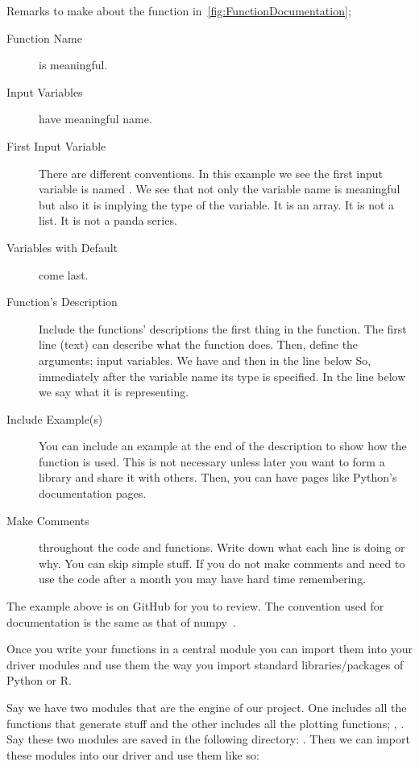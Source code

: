 \noindent Remarks to make about the function in~\cref{fig:FunctionDocumentation};
\begin{description}
\item [Function Name] is meaningful.
\item [Input Variables] have meaningful name. 
\item [First Input Variable] There are different conventions. In this
example we see the first input variable is named .
We see that not only the variable name is meaningful but also
it is implying the type of the variable. It is an array. It is not a list.
It is not a panda series. 
\item [Variables with Default] come last.

\item [Function's Description] Include the functions' descriptions
the first thing in the function. The first line (text) can describe what the function does. 
Then, define the arguments; input variables. 
We have  and then in the line below 
So, immediately after the variable name its type is specified. In the line below we
say what it is representing.

\item [Include Example(s)] You can include an example at the end of the
description to show how the function is used. This is not necessary unless
later you want to form a library and share it with others. Then, you can have pages
like Python's documentation pages.

\item [Make Comments] throughout the code and functions.
Write down what each line is doing or why. You can skip
simple stuff. If you do not make comments and need to use
the code after a month you may have hard time remembering.
\end{description}
The example above is on GitHub for you to review.
The convention used for documentation is the same as 
that of numpy~\citep{numpyStyle}.

Once you write your functions in a central module
you can import them into your driver modules and use
them the way you import standard libraries/packages of Python or R.

Say we have two modules that are the engine of our project.
One includes all the functions that generate stuff and the other
includes all the plotting functions; ,
.
Say these two modules are saved in 
the following directory:
.
Then we can import these modules into our driver
and use them like so:


